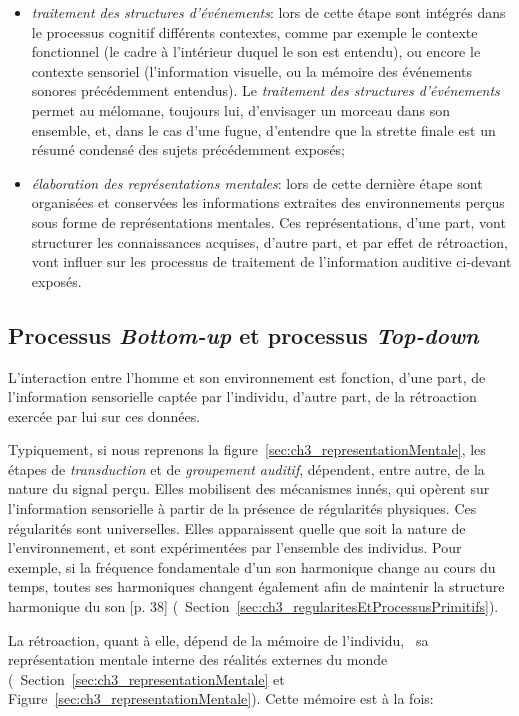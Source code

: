 \begin{itemize}
\item \emph{traitement des structures d'événements}: lors de cette étape sont intégrés dans le processus cognitif différents contextes, comme par exemple le contexte fonctionnel (le cadre à l'intérieur duquel le son est entendu), ou encore le contexte sensoriel (l'information visuelle, ou la mémoire des événements sonores précédemment entendus). Le \emph{traitement des structures d'événements} permet au mélomane, toujours lui, d'envisager un morceau dans son ensemble, et, dans le cas d'une fugue, d'entendre que la strette finale est un résumé condensé des sujets précédemment exposés;
\item \emph{élaboration des représentations mentales}: lors de cette dernière étape sont organisées et conservées les informations extraites des environnements perçus sous forme de représentations mentales. Ces représentations, d'une part, vont structurer les connaissances acquises, d'autre part, et par effet de rétroaction, vont influer sur les processus de traitement de l'information auditive ci-devant exposés.

\end{itemize}

\subsection{Processus \emph{Bottom-up} et processus \emph{Top-down}}
\label{sec:ch3_butd}

L'interaction entre l'homme et son environnement est fonction, d'une part, de l'information sensorielle captée par l'individu, d'autre part, de la rétroaction exercée par lui sur ces données. 

Typiquement, si nous reprenons la figure~\ref{sec:ch3_representationMentale}, les étapes de \emph{transduction} et de \emph{groupement auditif}, dépendent, entre autre, de la nature du signal perçu. Elles mobilisent des mécanismes innés, qui opèrent sur l'information sensorielle à partir de la présence de régularités physiques. Ces régularités sont universelles. Elles apparaissent quelle que soit la nature de l'environnement, et sont expérimentées par l'ensemble des individus. Pour exemple, si la fréquence fondamentale d'un son harmonique change au cours du temps, toutes ses harmoniques changent également afin de maintenir la structure harmonique du son [p. 38]\citep{bregman1994auditory} (\cf~Section~\ref{sec:ch3_regularitesEtProcessusPrimitifs}).

La rétroaction, quant à elle, dépend de la mémoire de l'individu, \ie~sa représentation mentale interne des réalités externes du monde (\cf~Section~\ref{sec:ch3_representationMentale} et Figure~\ref{sec:ch3_representationMentale}). Cette mémoire est à la fois:

